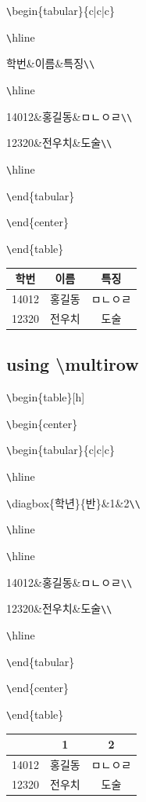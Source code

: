 \documentclass[11pt]{article}
\begin{document}
\verb+\+begin\{tabular\}\{c|c|c\}

\verb+\+hline

학번\&이름\&특징\verb+\+\verb+\+

\verb+\+hline

14012\&홍길동\&ㅁㄴㅇㄹ\verb+\+\verb+\+

12320\&전우치\&도술\verb+\+\verb+\+

\verb+\+hline

\verb+\+end\{tabular\}

\verb+\+end\{center\}

\verb+\+end\{table\}

\begin{table}[h]
	\begin{center}
		\begin{tabular}{c|c|c}
			\hline
			학번&이름&특징\\
			\hline
			14012&홍길동&ㅁㄴㅇㄹ\\
			12320&전우치&도술\\
			\hline
		\end{tabular}
	\end{center}
\end{table}

\subsection{using \textbackslash multirow}

\verb+\+begin\{table\}[h]

\verb+\+begin\{center\}

\verb+\+begin\{tabular\}\{c|c|c\}

\verb+\+hline

\verb+\+diagbox\{학년\}\{반\}\&1\&2\verb+\+\verb+\+

\verb+\+hline

\verb+\+hline

14012\&홍길동\&ㅁㄴㅇㄹ\verb+\+\verb+\+

12320\&전우치\&도술\verb+\+\verb+\+

\verb+\+hline

\verb+\+end\{tabular\}

\verb+\+end\{center\}

\verb+\+end\{table\}

\begin{table}[h]
	\begin{center}
		\begin{tabular}{c|c|c}
			\hline
			\diagbox{학년}{반}&1&2\\
			\hline
			\hline
			14012&홍길동&ㅁㄴㅇㄹ\\
			12320&전우치&도술\\
			\hline
		\end{tabular}
	\end{center}
\end{table}
\end{document}
